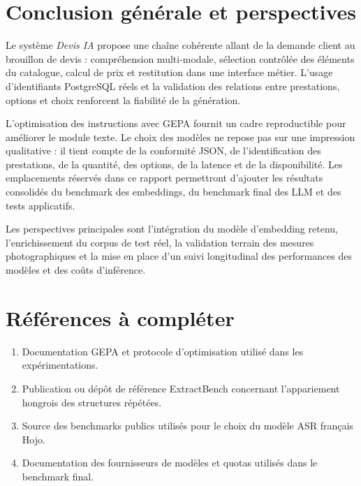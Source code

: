\section{Conclusion générale et perspectives}
Le système \textit{Devis IA} propose une chaîne cohérente allant de la demande client au brouillon de devis : compréhension multi-modale, sélection contrôlée des éléments du catalogue, calcul de prix et restitution dans une interface métier. L'usage d'identifiants PostgreSQL réels et la validation des relations entre prestations, options et choix renforcent la fiabilité de la génération.

L'optimisation des instructions avec GEPA fournit un cadre reproductible pour améliorer le module texte. Le choix des modèles ne repose pas sur une impression qualitative : il tient compte de la conformité JSON, de l'identification des prestations, de la quantité, des options, de la latence et de la disponibilité. Les emplacements réservés dans ce rapport permettront d'ajouter les résultats consolidés du benchmark des embeddings, du benchmark final des LLM et des tests applicatifs.

Les perspectives principales sont l'intégration du modèle d'embedding retenu, l'enrichissement du corpus de test réel, la validation terrain des mesures photographiques et la mise en place d'un suivi longitudinal des performances des modèles et des coûts d'inférence.

\newpage
\section*{Références à compléter}
\begin{enumerate}
\item Documentation GEPA et protocole d'optimisation utilisé dans les expérimentations.
\item Publication ou dépôt de référence ExtractBench concernant l'appariement hongrois des structures répétées.
\item Source des benchmarks publics utilisés pour le choix du modèle ASR français Hojo.
\item Documentation des fournisseurs de modèles et quotas utilisés dans le benchmark final.
\end{enumerate}
